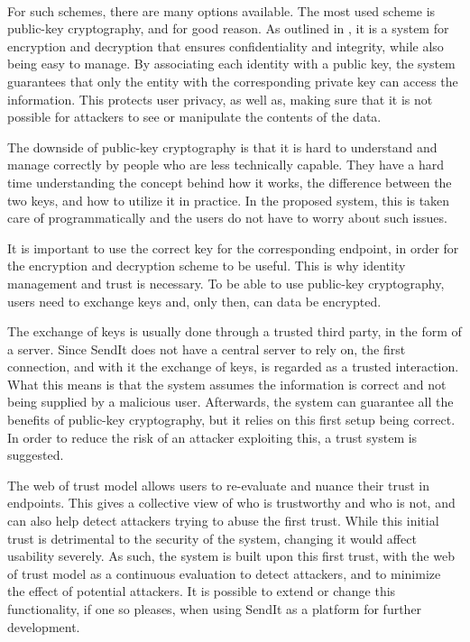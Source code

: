 \paragraph{}
%
For such schemes, there are many options available. The most used scheme is public-key cryptography, and for good reason. As outlined in , it is a system for encryption and decryption that ensures confidentiality and integrity, while also being easy to manage. By associating each identity with a public key, the system guarantees that only the entity with the corresponding private key can access the information. This protects user privacy, as well as, making sure that it is not possible for attackers to see or manipulate the contents of the data.

The downside of public-key cryptography is that it is hard to understand and manage correctly by people who are less technically capable. They have a hard time understanding the concept behind how it works, the difference between the two keys, and how to utilize it in practice. In the proposed system, this is taken care of programmatically and the users do not have to worry about such issues.

It is important to use the correct key for the corresponding endpoint, in order for the encryption and decryption scheme to be useful. This is why identity management and trust is necessary. To be able to use public-key cryptography, users need to exchange keys and, only then, can data be encrypted.

The exchange of keys is usually done through a trusted third party, in the form of a server. Since SendIt does not have a central server to rely on, the first connection, and with it the exchange of keys, is regarded as a trusted interaction. What this means is that the system assumes the information is correct and not being supplied by a malicious user. Afterwards, the system can guarantee all the benefits of public-key cryptography, but it relies on this first setup being correct. In order to reduce the risk of an attacker exploiting this, a trust system is suggested.

The web of trust model allows users to re-evaluate and nuance their trust in endpoints. This gives a collective view of who is trustworthy and who is not, and can also help detect attackers trying to abuse the first trust. While this initial trust is detrimental to the security of the system, changing it would affect usability severely. As such, the system is built upon this first trust, with the web of trust model as a continuous evaluation to detect attackers, and to minimize the effect of potential attackers. It is possible to extend or change this functionality, if one so pleases, when using SendIt as a platform for further development.
%
